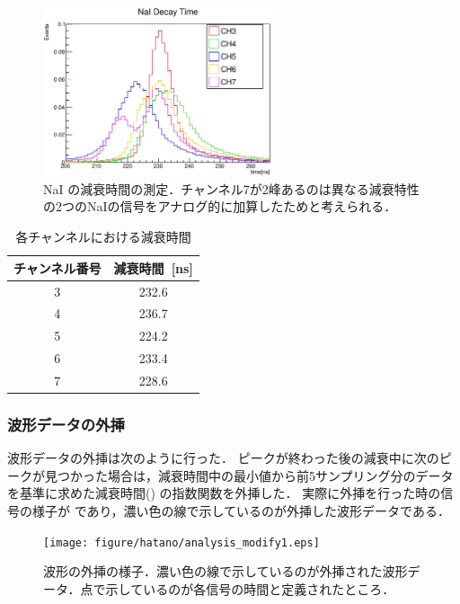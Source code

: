 \begin{figure}[hbt]
\centering
\includegraphics[width=0.6\textwidth]{figure/hatano/decaytime.eps}
\caption{NaI の減衰時間の測定．チャンネル7が2峰あるのは異なる減衰特性の2つのNaIの信号をアナログ的に加算したためと考えられる．}
\label{hatano_fig:decaytime}
\end{figure}

\begin{table}[hbt]
\centering
\caption{各チャンネルにおける減衰時間}
\begin{tabular}{cc}\\ \toprule
チャンネル番号 & 減衰時間~[ns]\\ \midrule
3 & 232.6 \\
4 & 236.7 \\
5 & 224.2 \\
6 & 233.4 \\
7 & 228.6 \\ \bottomrule
\end{tabular}
\label{hatano_tab:decaytime}
\end{table}

\subsubsection{波形データの外挿}
波形データの外挿は次のように行った．
ピークが終わった後の減衰中に次のピークが見つかった場合は，減衰時間中の最小値から前5サンプリング分のデータを基準に求めた減衰時間() の指数関数を外挿した．
実際に外挿を行った時の信号の様子が であり，濃い色の線で示しているのが外挿した波形データである．

\begin{figure}[hbt]
\centering
\texttt{[image: figure/hatano/analysis\_modify1.eps]}
\caption{波形の外挿の様子．濃い色の線で示しているのが外挿された波形データ．点で示しているのが各信号の時間と定義されたところ．}
\label{hatano_fig:analysis}
\end{figure}

